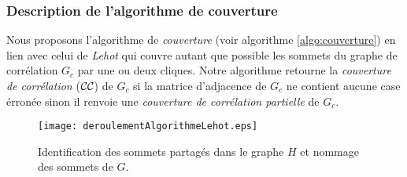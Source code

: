 \subsubsection{Description de l'algorithme de couverture}
Nous proposons  l'algorithme de {\em couverture} (voir algorithme \ref{algo:couverture}) en lien avec celui de {\em Lehot} qui couvre  autant que possible les sommets du graphe de corr\'elation  $G_c$ par une ou deux cliques.
Notre algorithme retourne la {\em couverture de corr\'elation} (${\cal CC}$) de $G_c$ si la matrice d'adjacence de $G_c$ ne contient aucune case \'erron\'ee sinon il renvoie une {\em couverture de corr\'elation partielle} de $G_c$.
\newline
\begin{figure}[htb!]
	\centering
	\texttt{[image: deroulementAlgorithmeLehot.eps]}\vspace{-0.5em}
	\caption{ Identification des sommets partag\'es dans le graphe $H$ et nommage des sommets de $G$. }\vspace{-0.5em}
	\label{deroulementAlgorithmeLehotRechercheSommetsPartages}
\end{figure}
\FloatBarrier

